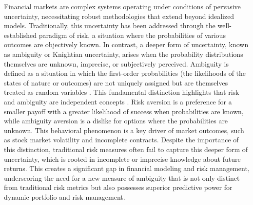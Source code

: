 \documentclass[preprint,12pt,authoryear]{elsarticle}
\begin{document}
Financial markets are complex systems operating under conditions of pervasive uncertainty, necessitating robust methodologies that extend beyond idealized models. Traditionally, this uncertainty has been addressed through the well-established paradigm of risk, a situation where the probabilities of various outcomes are objectively known. In contrast, a deeper form of uncertainty, known as ambiguity \cite{knight1921} or Knightian uncertainty, arises when the probability distributions themselves are unknown, imprecise, or subjectively perceived. Ambiguity is defined as a situation in which the first-order probabilities (the likelihoods of the states of nature or outcomes) are not uniquely assigned but are themselves treated as random variables \cite{ellsberg1961}. This fundamental distinction highlights that risk and ambiguity are independent concepts \cite{klibanoff200}. Risk aversion is a preference for a smaller payoff with a greater likelihood of success when probabilities are known, while ambiguity aversion is a dislike for options where the probabilities are unknown. This behavioral phenomenon is a key driver of market outcomes, such as stock market volatility and incomplete contracts. Despite the importance of this distinction, traditional risk measures often fail to capture this deeper form of uncertainty, which is rooted in incomplete or imprecise knowledge about future returns. This creates a significant gap in financial modeling and risk management, underscoring the need for a new measure of ambiguity that is not only distinct from traditional risk metrics but also possesses superior predictive power for dynamic portfolio and risk management\cite{Bollerslev1988}. 


\end{document}
